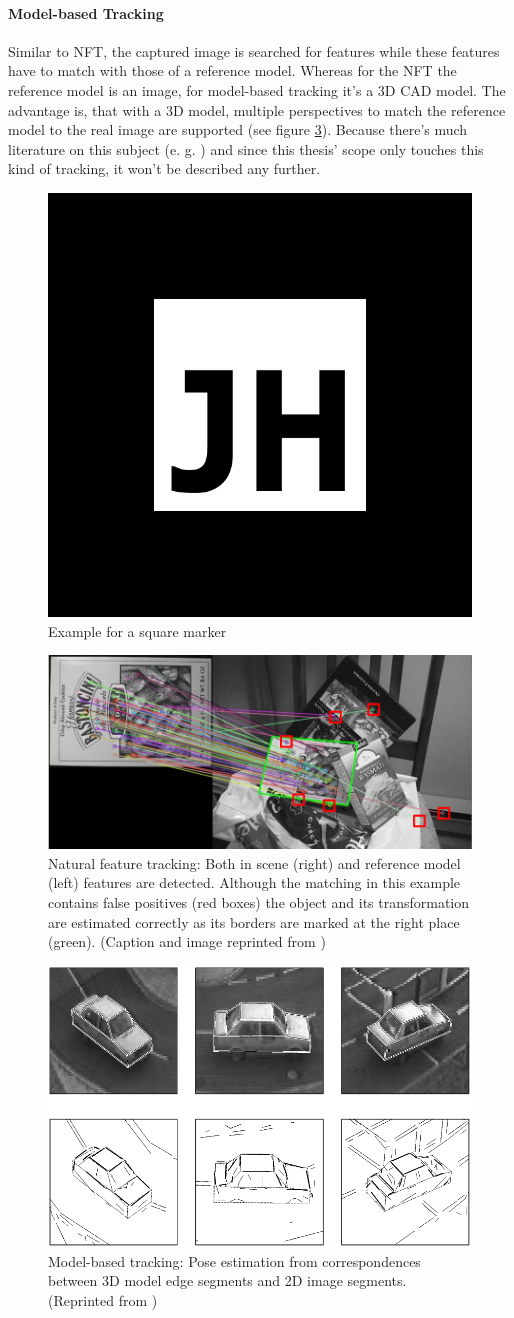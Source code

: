 \paragraph{Model-based Tracking}
Similar to NFT, the captured image is searched for features while these features have to match with those of a reference model. Whereas for the NFT the reference model is an image, for model-based tracking it's a 3D CAD model. The advantage is, that with a 3D model, multiple perspectives to match the reference model to the real image are supported (see figure \ref{fig:model-based-tracking}).
Because there's much literature on this subject (e. g. \citep{lepetit2005monocular}) and since this thesis' scope only touches this kind of tracking, it won't be described any further.

\begin{figure}[bth]
  \centering
        \includegraphics[width=.2\linewidth]{gfx/jh_marker}
        \caption{Example for a square marker}
        \label{fig:marker}
\end{figure}
\begin{figure}[bth]
  \centering
        \includegraphics[width=.65\linewidth]{gfx/nft_tracking_reprint}
        \caption{Natural feature tracking: Both in scene (right) and reference model (left) features are detected. Although the matching in this
example contains false positives (red boxes) the object and its transformation are estimated correctly
as its borders are marked at the right place (green). (Caption and image reprinted from \citep{hock2014augmented})}
        \label{fig:nft-tracking}
\end{figure}
\begin{figure}[bth]
  \centering
        \includegraphics[width=.45\linewidth]{gfx/model_based_tracking_reprint}
        \caption{Model-based tracking: Pose estimation from correspondences between 3D model edge segments and 2D image segments. (Reprinted from \citep{lepetit2005monocular})}
        \label{fig:model-based-tracking}
\end{figure}


